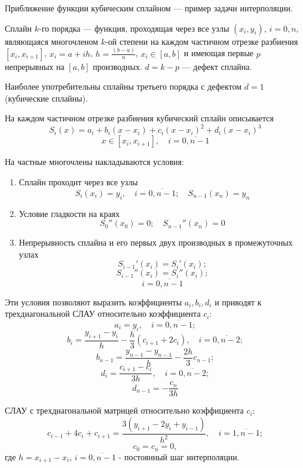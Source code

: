 \documentclass[a4paper, 14pt]{extarticle}
\begin{document}
Приближение функции кубическим сплайном — пример задачи интерполяции.


Сплайн \(k\)-го порядка — функция, проходящая через все узлы \((x_i, y_i)\),  
\(i = \overline{0, n}\), являющаяся многочленом \(k\)-ой степени на каждом частичном  
отрезке разбиения \([x_i, x_{i+1}]\), \(x_i = a + ih\), \(h = \frac{(b-a)}{n}\), \(x_i \in [a, b]\) и имеющая  
первые \(p\) непрерывных на \([a, b]\) производных.  
\(d = k - p\) — дефект сплайна. 

Наиболее употребительны сплайны третьего порядка с дефектом \(d = 1\) (кубические сплайны).  

На каждом частичном отрезке разбиения кубический сплайн описывается  
\[
S_i(x) = a_i + b_i(x - x_i) + c_i(x - x_i)^2 + d_i(x - x_i)^3
\]
\[
x \in [x_i, x_{i+1}], \quad i = \overline{0, n - 1}
\]

На частные многочлены накладываются условия:  

\begin{enumerate}
    \item Сплайн проходит через все узлы  
    \[
    S_i(x_i) = y_i, \quad i = \overline{0, n - 1}; \quad S_{n-1}(x_n) = y_n
    \]

    \item Условие гладкости на краях  
    \[
    S_0''(x_0) = 0; \quad S_{n-1}''(x_n) = 0
    \]

    \item Непрерывность сплайна и его первых двух производных в промежуточных узлах  
    \[
    S_{i-1}'(x_i) = S_i'(x_i);
    \]
    \[
    S_{i-1}''(x_i) = S_i''(x_i);
    \]
    \[
    i = \overline{0, n - 1}
    \]
\end{enumerate}

Эти условия позволяют выразить коэффициенты \(a_i, b_i, d_i\) и приводят к трехдиагональной СЛАУ относительно коэффициента \(c_i\):  
\[
a_i = y_i, \quad i = \overline{0, n - 1};
\]
\[
b_i = \frac{y_{i+1} - y_i}{h} - \frac{h}{3} (c_{i+1} + 2c_i), \quad i = \overline{0, n - 2};
\]
\[
b_{n-1} = \frac{y_{n-1} - y_{n-1}}{h} - \frac{2h}{3} c_{n-1};
\]
\[
d_i = \frac{c_{i+1} - c_i}{3h}, \quad i = \overline{0, n - 2};
\]
\[
d_{n-1} = -\frac{c_{n}}{3h}
\]

СЛАУ с трехдиагональной матрицей относительно коэффициента \(c_i\):  
\[
c_{i-1} + 4c_i + c_{i+1} = \frac{3(y_{i+1} - 2y_i + y_{i-1})}{h^2}, \quad i = \overline{1, n - 1};
\]
\[
c_0 = c_n = 0,
\]
где \(h = x_{i+1} - x_i\), \(i = \overline{0, n - 1}\) - постоянный шаг интерполяции.
\end{document}
